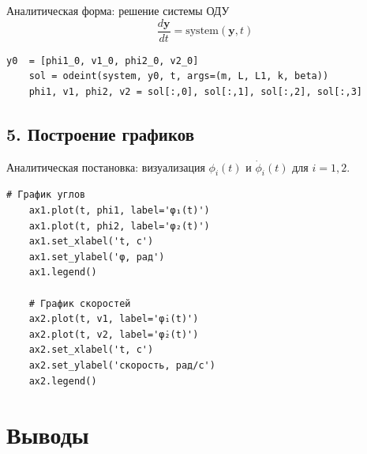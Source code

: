\documentclass[a4paper,11pt]{article}
\theoremstyle{definition}
\begin{document}
Аналитическая форма: решение системы ОДУ
\begin{equation}
  \frac{d\mathbf{y}}{dt} = \mathrm{system}(\mathbf{y}, t)\label{eq:equation3}
\end{equation}

\begin{lstlisting}[language=MyPython,label={lst:lstlisting4}]
    y0  = [phi1_0, v1_0, phi2_0, v2_0]
    sol = odeint(system, y0, t, args=(m, L, L1, k, beta))
    phi1, v1, phi2, v2 = sol[:,0], sol[:,1], sol[:,2], sol[:,3]
\end{lstlisting}

\subsection*{5. Построение графиков}

Аналитическая постановка: визуализация $\phi_i(t)$ и $\dot{\phi}_i(t)$ для $i=1,2$.

\begin{lstlisting}[language=MyPython,label={lst:lstlisting5}]
    # График углов
    ax1.plot(t, phi1, label='φ₁(t)')
    ax1.plot(t, phi2, label='φ₂(t)')
    ax1.set_xlabel('t, с')
    ax1.set_ylabel('φ, рад')
    ax1.legend()

    # График скоростей
    ax2.plot(t, v1, label='φ̇₁(t)')
    ax2.plot(t, v2, label='φ̇₂(t)')
    ax2.set_xlabel('t, с')
    ax2.set_ylabel('скорость, рад/с')
    ax2.legend()
\end{lstlisting}

%
%


\section*{Выводы}
\end{document}
